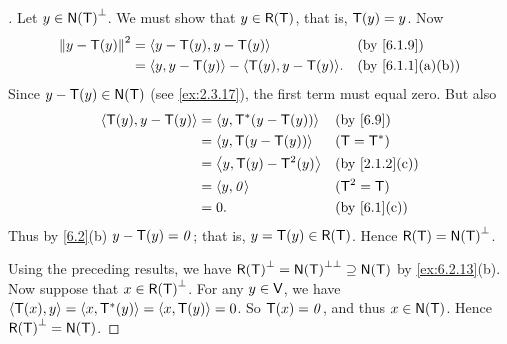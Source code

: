 \begin{proof}[]
  Let \(y \in \ns{\T}^{\perp}\).
  We must show that \(y \in \rg{\T}\), that is, \(\mathsf{T}(y) = y\).
  Now
  \begin{align*}
    \norm{y - \T(y)}^2 & = \inn{y - \T(y), y - \T(y)}                   &  & \by{6.1.9}      \\
                       & = \inn{y, y - \T(y)} - \inn{\T(y), y - \T(y)}. &  & \by{6.1.1}[a,b]
  \end{align*}
  Since \(y - \T(y) \in \ns{\T}\) (see \cref{ex:2.3.17}), the first term must equal zero.
  But also
  \begin{align*}
    \inn{\T(y), y - \T(y)} & = \inn{y, \T^*(y - \T(y))} &  & \by{6.9}      \\
                           & = \inn{y, \T(y - \T(y))}   &  & (\T = \T^*)   \\
                           & = \inn{y, \T(y) - \T^2(y)} &  & \by{2.1.2}[c] \\
                           & = \inn{y, \zv}             &  & (\T^2 = \T)   \\
                           & = 0.                       &  & \by{6.1}[c]
  \end{align*}
  Thus by \cref{6.2}(b) \(y - \mathsf{T}(y) = \mathit{0}\);
  that is, \(y = \T(y) \in \rg{\T}\).
  Hence \(\rg{\T} = \ns{\T}^{\perp}\).

  Using the preceding results, we have \(\rg{\T}^{\perp} = \ns{\T}^{\perp \perp} \supseteq \ns{\T}\) by \cref{ex:6.2.13}(b).
  Now suppose that \(x \in \rg{\T}^{\perp}\).
  For any \(y \in \mathsf{V}\), we have \(\left\langle\mathsf{T}(x), y\right\rangle = \left\langle x, \mathsf{T}^*(y)\right\rangle = \left\langle x, \mathsf{T}(y)\right\rangle = 0\).
  So \(\mathsf{T}(x) = \mathit{0}\), and thus \(x \in \ns{\T}\).
  Hence \(\rg{\T}^{\perp} = \ns{\T}\).
\end{proof}

\exercisesection

\begin{ex}\label{ex:6.6.9}

\end{ex}

\begin{ex}\label{ex:6.6.10}

\end{ex}
